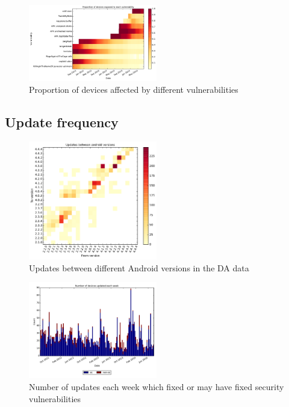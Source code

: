 \documentclass[conference,a4paper,twoside]{IEEEtran}
\begin{document}
\begin{figure}
 \includegraphics[width=0.5\textwidth]{figures/nvulnerabilities_heat.pdf}
 \caption{Proportion of devices affected by different vulnerabilities}
 \label{fig:nvulnerabilities_heat}
\end{figure}

\subsection{Update frequency}
\begin{figure}
 \includegraphics[width=0.5\textwidth]{figures/from_to_updates.pdf}
 \caption{Updates between different Android versions in the DA data}
 \label{fig:from_to_updates}
\end{figure}
\begin{figure}
 \includegraphics[width=0.5\textwidth]{figures/w_security_updates.pdf}
 \caption{Number of updates each week which fixed or may have fixed security vulnerabilities}
 \label{fig:weekly_security_updates}
\end{figure}
\end{document}
